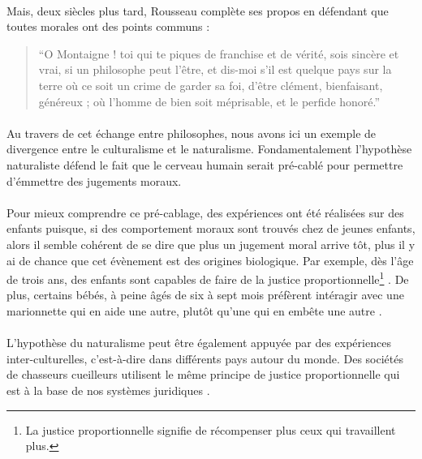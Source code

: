 \documentclass[10pt, french, a4paper]{report}
\begin{document}
\paragraph{}
Mais, deux siècles plus tard, Rousseau complète ses propos en défendant que toutes morales ont des points communs :

\begin{quotation}
  ``O Montaigne ! toi qui te piques de franchise et de vérité, sois sincère et vrai, si un philosophe peut l’être, et dis-moi s’il est quelque pays sur la terre où ce soit un crime de garder sa foi, d’être clément, bienfaisant, généreux ; où l’homme de bien soit méprisable, et le perfide honoré.''
\end{quotation} 

\paragraph{}
Au travers de cet échange entre philosophes, nous avons ici un exemple de divergence entre le culturalisme et le naturalisme. Fondamentalement l'hypothèse naturaliste défend le fait que le cerveau humain serait pré-cablé pour permettre d'émmettre des jugements moraux.

\paragraph{}
Pour mieux comprendre ce pré-cablage, des expériences ont été réalisées sur des enfants puisque, si des comportement moraux sont trouvés chez de jeunes enfants, alors il semble cohérent de se dire que plus un jugement moral arrive tôt, plus il y ai de chance que cet évènement est des origines biologique. Par exemple, dès l'âge de trois ans, des enfants sont capables de faire de la justice proportionnelle\footnote{La justice proportionnelle signifie de récompenser plus ceux qui travaillent plus.} \citep{baumard_preschoolers_2012}. De plus, certains bébés, à peine âgés de six à sept mois préfèrent intéragir avec une marionnette qui en aide une autre, plutôt qu'une qui en embête une autre \citep{hamlin_social_2007}.

\paragraph{}
L'hypothèse du naturalisme peut être également appuyée par des expériences inter-culturelles, c'est-à-dire dans différents pays autour du monde. Des sociétés de chasseurs cueilleurs utilisent le même principe de justice proportionnelle qui est à la base de nos systèmes juridiques \citep{gurven_give_2004}.
\end{document}
